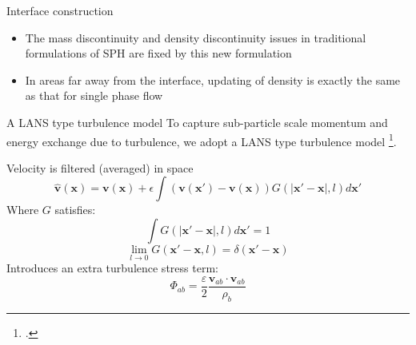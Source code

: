 \documentclass{beamer}
\begin{document}
\begin{frame}{Interface construction}
\begin{minipage}{0.27 \textwidth}
\begin{figure}
\end{figure}
\end{minipage}

\begin{block}{}
  \begin{itemize}
    \item {The mass discontinuity and density discontinuity issues in traditional formulations of SPH are fixed by this new formulation
    } 
    \item {In areas far away from the interface, updating of density is exactly the same as that for single phase flow
    }
 \end{itemize}
\end{block}
\end{frame}

\begin{frame}{A LANS type turbulence model}
To capture sub-particle scale momentum and energy exchange due to turbulence, we adopt a LANS type turbulence model \footcite{monaghan2011turbulence}.\\
\noindent
\begin{minipage}{0.65 \textwidth}
Velocity is filtered (averaged) in space
\begin{equation}
\widehat{\textbf{v}}\left(\textbf{x}\right)=\textbf{v}\left(\textbf{x}\right)+ \epsilon \int \left(\textbf{v}\left(\textbf{x} \prime\right)-\textbf{v}\left(\textbf{x}\right)\right)G\left(\vert \textbf{x} \prime - \textbf{x} \vert, l\right) d\textbf{x} \prime
\end{equation}
Where $G$ satisfies:
\begin{equation}
\int G\left(\vert \textbf{x} \prime - \textbf{x} \vert, l\right) d\textbf{x} \prime =1
\end{equation}
\begin{equation}
\lim _{l \rightarrow 0} G\left(\textbf{x} \prime-\textbf{x}, l\right) =  \delta \left(\textbf{x} \prime - \textbf{x}\right)
\label{eq:SPH_kernel_delta}
\end{equation}
Introduces an extra turbulence stress term:
\begin{equation}
\Phi_{ab}=\dfrac{\varepsilon}{2} \dfrac{\textbf{v}_{ab} \cdot \textbf{v}_{ab}}{\rho_b} \label{eq:_LANS_trub_stress}
\end{equation}
\end{minipage}
%
\begin{minipage}{0.34 \textwidth}
\begin{figure}

\end{figure}
\end{minipage}
\end{frame}
\end{document}
